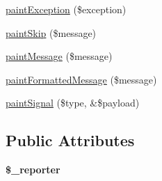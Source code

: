 \begin{DoxyCompactItemize}
\hyperlink{class_simple_reporter_decorator_ae7062bed7d3fbfdce2f75850d6e86674}{paintException} (\$exception)
\item 
\hyperlink{class_simple_reporter_decorator_a40539ad16a5ce944fe4d2ea479bca897}{paintSkip} (\$message)
\item 
\hyperlink{class_simple_reporter_decorator_a42f3412ccd3f983be7b5a6bdb7cff7c1}{paintMessage} (\$message)
\item 
\hyperlink{class_simple_reporter_decorator_a15ee8be1412a746135526e83b2ba307b}{paintFormattedMessage} (\$message)
\item 
\hyperlink{class_simple_reporter_decorator_a94cd17c8d29e7a30fe8a37108d707fbd}{paintSignal} (\$type, \&\$payload)
\end{DoxyCompactItemize}
\subsection*{Public Attributes}
\begin{DoxyCompactItemize}
\item 
\hypertarget{class_simple_reporter_decorator_a5beb9f23aec954a06061835c24858768}{
{\bfseries \$\_\-reporter}}
\label{class_simple_reporter_decorator_a5beb9f23aec954a06061835c24858768}

\end{DoxyCompactItemize}


